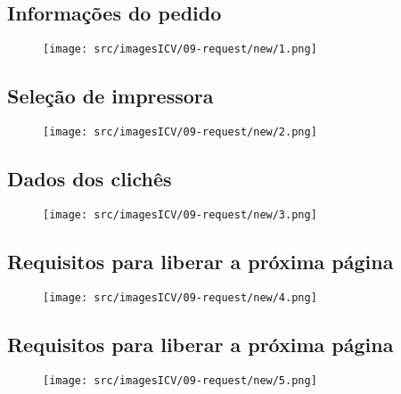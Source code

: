 \thispagestyle{fancy}
\vspace{\fill}
\subsection{\small Informações do pedido}
\begin{figure}
    \centering
    \texttt{[image: src/imagesICV/09-request/new/1.png]}
\end{figure}
\newpage

\thispagestyle{fancy}
\vspace{\fill}
\subsection{\small Seleção de impressora}
\begin{figure}
    \centering
    \texttt{[image: src/imagesICV/09-request/new/2.png]}
\end{figure}
\newpage

\thispagestyle{fancy}
\vspace{\fill}
\subsection{\small Dados dos clichês}
\begin{figure}
    \centering
    \texttt{[image: src/imagesICV/09-request/new/3.png]}
\end{figure}
\newpage

\thispagestyle{fancy}
\vspace{\fill}
\subsection{\small Requisitos para liberar a próxima página}
\begin{figure}
    \centering
    \texttt{[image: src/imagesICV/09-request/new/4.png]}
\end{figure}
\newpage

\thispagestyle{fancy}
\vspace{\fill}
\subsection{\small Requisitos para liberar a próxima página}
\begin{figure}
    \centering
    \texttt{[image: src/imagesICV/09-request/new/5.png]}
\end{figure}
\newpage

